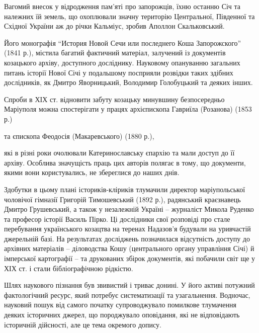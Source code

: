 
Вагомий внесок у відродження пам'яті про запорожців, їхню останню Січ та
належних їй земель, що охоплювали значну територію Центральної, Південної та
Східної України аж до річки Кальміус, зробив Аполлон Скальковський.

Його монографія \enquote{История Новой Сечи или последнего Коша Запорожского} (1841
р.), містила багатий фактичний матеріал, залучений із документів козацького
архіву, доступного досліднику. Науковому опануванню загальних питань  історії
Нової Січі у подальшому посприяли розвідки таких здібних дослідників, як Дмитро
Яворницький, Володимир Голобуцький та деяких інших. 

Спроби в ХІХ ст. відновити забуту козацьку минувшину  безпосередньо Маріуполя
можна спостерігати у працях архієпископа Гавриїла (Розанова) (1853 р.)


та єпископа Феодосія (Макаревського) (1880 р.),


які в різні роки очолювали Катеринославську єпархію та мали доступ до її
архіву. Особлива значущість праць цих авторів полягає в тому, що документи,
якими вони користувались, не збереглися до наших днів.

Здобутки в цьому плані істориків-кліриків тлумачили директор маріупольської
чоловічої гімназії Григорій Тимошевський (1892 р.), радянський краєзнавець
Дмитро Грушевський, а також у незалежній Україні – журналіст Микола Руденко та
професор історії Василь Пірко. Ці дослідники свої розповіді про  стале
перебування українського козацтва на теренах Надазов'я будували на уривчастій
джерельній базі. На результатах досліджень позначилася відсутність доступу до
архівних матеріалів – діловодства Кошу (центрального органу управління Січі) й
імперської картографії – та друкованих збірок документів, які побачили світ ще
у ХІХ ст. і стали бібліографічною рідкістю. 

Шлях наукового пізнання був звивистий і триває донині.  У його активі потужний
фактологічний ресурс, який потребує систематизації та узагальнення. Водночас,
науковий пошук від самого початку супроводжувало  помилкове тлумачення деяких
історичних джерел, що породжувало оповідання, які не відповідають історичній
дійсності, але це тема окремого допису.

